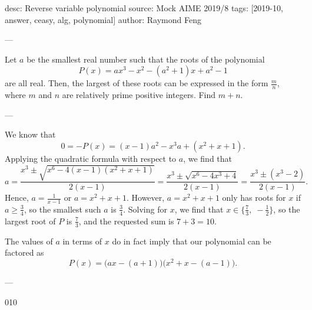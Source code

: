 desc: Reverse variable polynomial
source: Mock AIME 2019/8
tags: [2019-10, answer, ceasy, alg, polynomial]
author: Raymond Feng

---

Let $a$ be the smallest real number such that the roots of the polynomial \[P(x)=ax^3-x^2-(a^2+1)x+a^2-1\]
are all real. Then, the largest of these roots can be expressed in the form $\tfrac mn$, where $m$ and $n$ are relatively prime positive integers. Find $m+n$.

---

We know that \[0=-P(x)=(x-1)a^2-x^3a+(x^2+x+1).\]
Applying the quadratic formula with respect to $a$, we find that \[a=\frac{x^3\pm\sqrt{x^6-4(x-1)(x^2+x+1)}}{2(x-1)}=\frac{x^3\pm\sqrt{x^6-4x^3+4}}{2(x-1)}=\frac{x^3\pm(x^3-2)}{2(x-1)}.\]
Hence, $a=\frac1{x-1}$ or $a=x^2+x+1$. However, $a=x^2+x+1$ only has roots for $x$ if $a\ge\tfrac34$, so the smallest such $a$ is $\tfrac34$. Solving for $x$, we find that $x\in\{\frac73,\;-\frac12\}$, so the largest root of $P$ is $\tfrac73$, and the requested sum is $7+3=10$.
\begin{remark}
    The values of $a$ in terms of $x$ do in fact imply that our polynomial can be factored as \[P(x)=\big(ax-(a+1)\big)\big(x^2+x-(a-1)\big).\]
\end{remark}

---

010
